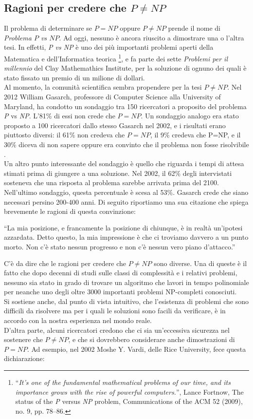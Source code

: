 \documentclass[12pt,a4paper]{report}
\theoremstyle{definition}
\begin{document}
\subsection{Ragioni per credere che $P \neq NP$}


Il problema di determinare se $P=NP$	oppure $P \neq NP$ prende il nome di \emph{Problema $P$ vs $NP$}. Ad oggi, nessuno è ancora riuscito a dimostrare una o l'altra tesi. In effetti, \emph{P vs NP} è uno dei più importanti problemi aperti della Matematica e dell'Informatica teorica \footnote{``\emph{It's one of the fundamental mathematical problems of our time, and its importance grows with the rise of powerful computers.}'', Lance Fortnow, The status of the \emph{P} versus \emph{NP} problem, Communications of the ACM 52 (2009), no. 9, pp. 78–86.}, e fa parte dei sette \emph{Problemi per il millennio} del Clay Mathemathics Institute, per la soluzione di ognuno dei quali è stato fissato un premio di un milione di dollari.\\
Al momento, la comunità scientifica sembra propendere per la tesi $P \neq NP$. Nel 2012 William Gasarch, professore di Computer Science alla University of Maryland, ha condotto un sondaggio tra 150 ricercatori a proposito del problema \emph{P} vs \emph{NP}. L'81\% di essi non crede che $P=NP$. Un sondaggio analogo era stato proposto a 100 ricercatori dallo stesso Gasarch nel 2002, e i risultati erano piuttosto diversi: il 61\% non credeva che $P=NP$, il 9\% credeva che P=NP, e il 30\% diceva di non sapere oppure era convinto che il problema non fosse risolvibile \cite{Rosenberger:tesi}.\\
Un altro punto interessante del sondaggio è quello che riguarda i tempi di attesa stimati prima di giungere a una soluzione. Nel 2002, il 62\% degli intervistati sosteneva che una risposta al problema sarebbe arrivata prima del 2100. Nell'ultimo sondaggio, questa percentuale è scesa al 53\%. Gasarch crede che siano necessari persino 200-400 anni. Di seguito riportiamo una sua citazione che spiega brevemente le ragioni di questa convinzione:

``La mia posizione, e francamente la posizione di chiunque, è in realtà un'ipotesi azzardata. Detto questo, la mia impressione è che ci troviamo davvero a un punto morto. Non c'è stato nessun progresso e non c'è nessun vero piano d'attacco.''\cite{Rosenberger:tesi}

C'è da dire che le ragioni per credere che $P \neq NP$ sono diverse. Una di queste è il fatto che dopo decenni di studi sulle classi di complessità e i relativi problemi, nessuno sia stato in grado di trovare un algoritmo che lavori in tempo polinomiale per neanche uno degli oltre 3000 importanti problemi NP-completi conosciuti.\\
Si sostiene anche, dal punto di vista intuitivo, che l'esistenza di problemi che sono difficili da risolvere ma per i quali le soluzioni sono facili da verificare, è in accordo con la nostra esperienza nel mondo reale.\\
D'altra parte, alcuni ricercatori credono che ci sia un'eccessiva sicurezza nel sostenere che $P \neq NP$, e che si dovrebbero considerare anche dimostrazioni di $P=NP$. Ad esempio, nel 2002 Moshe Y. Vardi, delle Rice University, fece questa dichiarazione:
\end{document}
